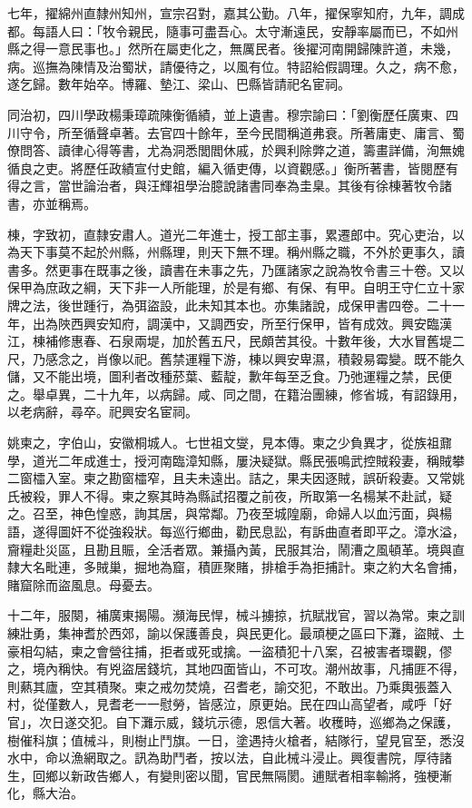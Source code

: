 \begin{pinyinscope}
七年，擢綿州直隸州知州，宣宗召對，嘉其公勤。八年，擢保寧知府，九年，調成都。每語人曰：「牧令親民，隨事可盡吾心。太守漸遠民，安靜率屬而已，不如州縣之得一意民事也。」然所在屬吏化之，無厲民者。後擢河南開歸陳許道，未幾，病。巡撫為陳情及治蜀狀，請優待之，以風有位。特詔給假調理。久之，病不愈，遂乞歸。數年始卒。博羅、墊江、梁山、巴縣皆請祀名宦祠。

同治初，四川學政楊秉璋疏陳衡循績，並上遺書。穆宗諭曰：「劉衡歷任廣東、四川守令，所至循聲卓著。去官四十餘年，至今民間稱道弗衰。所著庸吏、庸言、蜀僚問答、讀律心得等書，尤為洞悉閭閻休戚，於興利除弊之道，籌畫詳備，洵無媿循良之吏。將歷任政績宣付史館，編入循吏傳，以資觀感。」衡所著書，皆閱歷有得之言，當世論治者，與汪輝祖學治臆說諸書同奉為圭臬。其後有徐棟著牧令諸書，亦並稱焉。

棟，字致初，直隸安肅人。道光二年進士，授工部主事，累遷郎中。究心吏治，以為天下事莫不起於州縣，州縣理，則天下無不理。稱州縣之職，不外於更事久，讀書多。然更事在既事之後，讀書在未事之先，乃匯諸家之說為牧令書三十卷。又以保甲為庶政之綱，天下非一人所能理，於是有鄉、有保、有甲。自明王守仁立十家牌之法，後世踵行，為弭盜設，此未知其本也。亦集諸說，成保甲書四卷。二十一年，出為陜西興安知府，調漢中，又調西安，所至行保甲，皆有成效。興安臨漢江，棟補修惠春、石泉兩堤，加於舊五尺，民頗苦其役。十數年後，大水冒舊堤二尺，乃感念之，肖像以祀。舊禁運糧下游，棟以興安卑濕，積穀易霉變。既不能久儲，又不能出境，圖利者改種菸葉、藍靛，歉年每至乏食。乃弛運糧之禁，民便之。舉卓異，二十九年，以病歸。咸、同之間，在籍治團練，修省城，有詔錄用，以老病辭，尋卒。祀興安名宦祠。

姚柬之，字伯山，安徽桐城人。七世祖文燮，見本傳。柬之少負異才，從族祖鼐學，道光二年成進士，授河南臨漳知縣，屢決疑獄。縣民張鳴武控賊殺妻，稱賊攀二窗櫺入室。柬之勘窗櫺窄，且夫未遠出。詰之，果夫因逐賊，誤斫殺妻。又常姚氏被殺，罪人不得。柬之察其時為縣試招覆之前夜，所取第一名楊某不赴試，疑之。召至，神色惶惑，詢其居，與常鄰。乃夜至城隍廟，命婦人以血污面，與楊語，遂得圖奸不從強殺狀。每巡行鄉曲，勸民息訟，有訴曲直者即平之。漳水溢，齎糧赴災區，且勘且賑，全活者眾。兼攝內黃，民服其治，鬧漕之風頓革。境與直隸大名毗連，多賊巢，掘地為窟，積匪聚賭，排槍手為拒捕計。柬之約大名會捕，賭窟除而盜風息。母憂去。

十二年，服闋，補廣東揭陽。瀕海民悍，械斗擄掠，抗賦戕官，習以為常。柬之訓練壯勇，集神耆於西郊，諭以保護善良，與民更化。最頑梗之區曰下灘，盜賊、土豪相勾結，柬之會營往捕，拒者或死或擒。一盜積犯十八案，召被害者環觀，僇之，境內稱快。有兇盜居錢坑，其地四面皆山，不可攻。潮州故事，凡捕匪不得，則爇其廬，空其積聚。柬之戒勿焚燒，召耆老，諭交犯，不敢出。乃乘輿張蓋入村，從僅數人，見耆老一一慰勞，皆感泣，原更始。民在四山高望者，咸呼「好官」，次日遂交犯。自下灘示威，錢坑示德，恩信大著。收穫時，巡鄉為之保護，樹催科旗；值械斗，則樹止鬥旗。一日，塗遇持火槍者，結隊行，望見官至，悉沒水中，命以漁網取之。訊為助鬥者，按以法，自此械斗浸止。興復書院，厚待諸生，回鄉以新政告鄉人，有變則密以聞，官民無隔閡。逋賦者相率輸將，強梗漸化，縣大治。


\end{pinyinscope}
